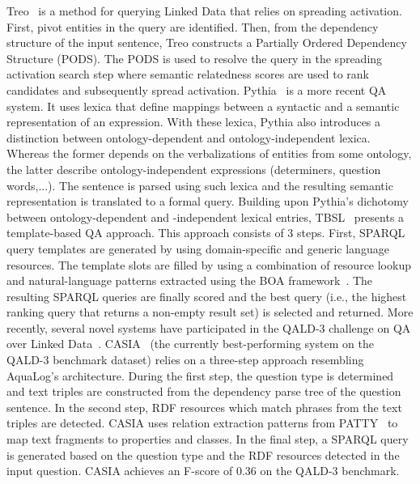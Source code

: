 Treo~\cite{treo} is a method for querying Linked Data that relies on spreading activation.
First, pivot entities in the query are identified.
Then, from the dependency structure of the input sentence, Treo constructs a Partially Ordered Dependency Structure (PODS).
The PODS is used to resolve the query in the spreading activation search step where semantic relatedness scores are used to rank candidates and subsequently spread activation.
Pythia~\cite{pythia} is a more recent QA system.
It uses lexica that define mappings between a syntactic and a semantic representation of an expression.
With these lexica, Pythia also introduces a distinction between ontology-dependent and ontology-independent lexica. 
Whereas the former depends on the verbalizations of entities from some ontology, the latter describe ontology-independent expressions (determiners, question words,...).
The sentence is parsed using such lexica and the resulting semantic representation is translated to a formal query.
Building upon Pythia's dichotomy between ontology-dependent and -independent lexical entries, TBSL~\cite{tbsl} presents a tem\-plate-based QA approach. 
This approach consists of 3 steps. First, SPARQL query templates are generated by using do\-main-specific and generic language resources.
The template slots are filled by using a combination of resource lookup and natural-language patterns extracted using the BOA framework~\cite{BOA}. The resulting SPARQL queries are finally scored and the best query (i.e., the highest ranking query that returns a non-empty result set) is selected and returned. 
More recently, several novel systems have participated in the QALD-3 challenge on QA over Linked Data~\cite{qald3}.  
CASIA~\cite{casia} (the currently best-performing system on the QALD-3 benchmark dataset) relies on a three-step approach resembling AquaLog's architecture.
During the first step, the question type is determined and text triples are constructed from the dependency parse tree of the question sentence. 
In the second step, RDF resources which match phrases from the text triples are detected. 
CASIA uses relation extraction patterns from PATTY~\cite{patty} to map text fragments to properties and classes.
In the final step, a SPARQL query is generated based on the question type and the RDF resources detected in the input question.
CASIA achieves an F-score of $0.36$ on the QALD-3 benchmark.

